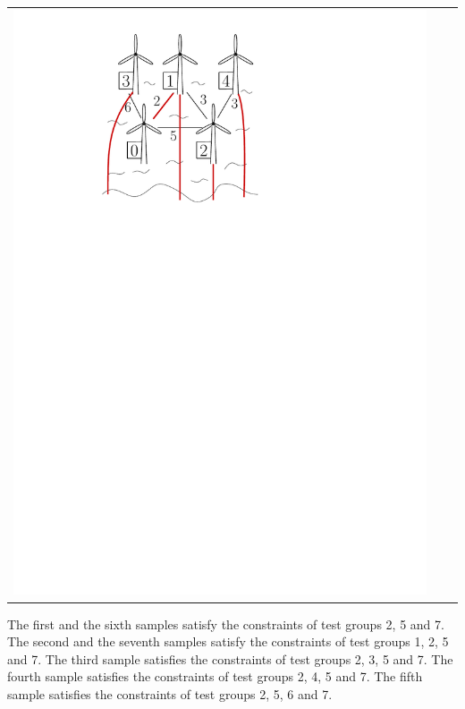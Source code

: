 \begin{center}
\begin{tabular}{p{} p{} p{}}
\includegraphics[width=\textwidth]{sample1q3} \\
\end{tabular}
\end{center}

The first and the sixth samples satisfy the constraints of test groups 2, 5 and 7. The second and the seventh samples satisfy the constraints of test groups 1, 2, 5 and 7. The third sample satisfies the constraints of test groups 2, 3, 5 and 7. The fourth sample satisfies the constraints of test groups 2, 4, 5 and 7. The fifth sample satisfies the constraints of test groups 2, 5, 6 and 7.


